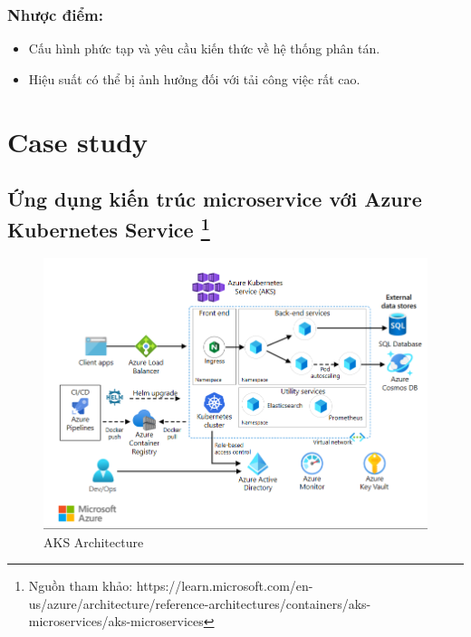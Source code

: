 \subsubsection{Nhược điểm:}
\begin{itemize}
    \item Cấu hình phức tạp và yêu cầu kiến thức về hệ thống phân tán.
    \item Hiệu suất có thể bị ảnh hưởng đối với tải công việc rất cao.
\end{itemize}
\newpage
\section{Case study}
\subsection{Ứng dụng kiến trúc microservice với Azure Kubernetes Service \protect\footnote{Nguồn tham khảo: https://learn.microsoft.com/en-us/azure/architecture/reference-architectures/containers/aks-microservices/aks-microservices}}
\begin{figure}[H]
    \begin{center}
    \includegraphics[scale=0.8]{images/hieu/chap-2/aks-architecture.png}
    \vspace*{5mm}
    \caption{AKS Architecture}
    \end{center}
\end{figure}
